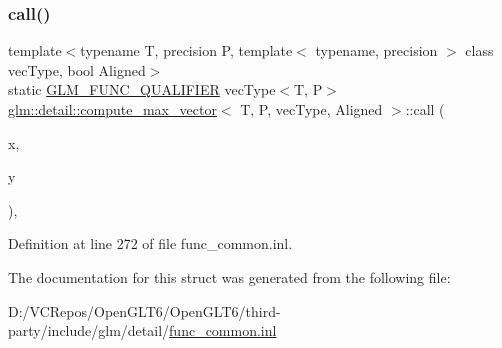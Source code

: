 \subsubsection{\texorpdfstring{call()}{call()}}
{\footnotesize\ttfamily template$<$typename T, precision P, template$<$ typename, precision $>$ class vec\+Type, bool Aligned$>$ \\
static \mbox{\hyperlink{setup_8hpp_a33fdea6f91c5f834105f7415e2a64407}{G\+L\+M\+\_\+\+F\+U\+N\+C\+\_\+\+Q\+U\+A\+L\+I\+F\+I\+ER}} vec\+Type$<$T, P$>$ \mbox{\hyperlink{structglm_1_1detail_1_1compute__max__vector}{glm\+::detail\+::compute\+\_\+max\+\_\+vector}}$<$ T, P, vec\+Type, Aligned $>$\+::call (\begin{DoxyParamCaption}\item[{vec\+Type$<$ T, P $>$ const \&}]{x,  }\item[{vec\+Type$<$ T, P $>$ const \&}]{y }\end{DoxyParamCaption})\hspace{0.3cm}{\ttfamily [inline]}, {\ttfamily [static]}}



Definition at line 272 of file func\+\_\+common.\+inl.



The documentation for this struct was generated from the following file\+:\begin{DoxyCompactItemize}
\item 
D\+:/\+V\+C\+Repos/\+Open\+G\+L\+T6/\+Open\+G\+L\+T6/third-\/party/include/glm/detail/\mbox{\hyperlink{func__common_8inl}{func\+\_\+common.\+inl}}\end{DoxyCompactItemize}
